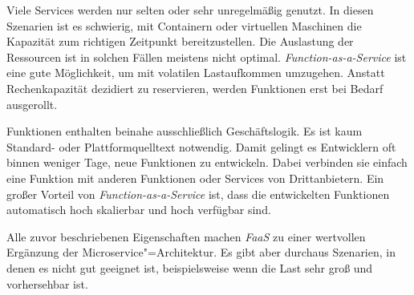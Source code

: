 Viele Services werden nur selten oder sehr unregelmäßig genutzt. In diesen Szenarien ist es schwierig, mit Containern oder virtuellen Maschinen die Kapazität zum richtigen Zeitpunkt bereitzustellen. Die Auslastung der Ressourcen ist in solchen Fällen meistens nicht optimal. \textit{Function-as-a-Service} ist eine gute Möglichkeit, um mit volatilen Lastaufkommen umzugehen. Anstatt Rechenkapazität dezidiert zu reservieren, werden Funktionen erst bei Bedarf ausgerollt.

Funktionen enthalten beinahe ausschließlich Geschäftslogik. Es ist kaum Standard- oder Plattformquelltext notwendig. Damit gelingt es Entwicklern oft binnen weniger Tage, neue Funktionen zu entwickeln. Dabei verbinden sie einfach eine Funktion mit anderen Funktionen oder Services von Drittanbietern. Ein großer Vorteil von \textit{Function-as-a-Service} ist, dass die entwickelten Funktionen automatisch hoch skalierbar und hoch verfügbar sind.

Alle zuvor beschriebenen Eigenschaften machen \textit{FaaS} zu einer wertvollen Ergänzung der Microservice"=Architektur. Es gibt aber durchaus Szenarien, in denen es nicht gut geeignet ist, beispielsweise wenn die Last sehr groß und vorhersehbar ist.